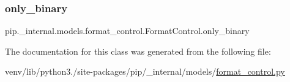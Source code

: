\subsubsection{\texorpdfstring{only\+\_\+binary}{only\_binary}}
{\footnotesize\ttfamily pip.\+\_\+internal.\+models.\+format\+\_\+control.\+Format\+Control.\+only\+\_\+binary\hspace{0.3cm}{\ttfamily [static]}}



The documentation for this class was generated from the following file\+:\begin{DoxyCompactItemize}
\item 
venv/lib/python3./site-\/packages/pip/\+\_\+internal/models/\hyperlink{format__control_8py}{format\+\_\+control.\+py}\end{DoxyCompactItemize}
